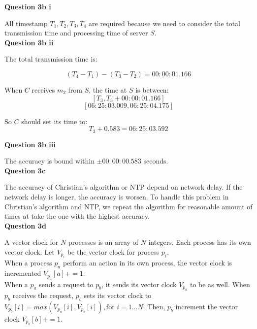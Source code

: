 \documentclass[11pt,a4paper]{report}
\begin{document}
\begin{multicols*}{2}
\noindent \textbf{Question 3b i}

\noindent All timestamp $T_1,T_2,T_3,T_4$ are required because we need to consider the total transmission time and processing time of server $S$.\\

\noindent \textbf{Question 3b ii}

\noindent The total transmission time is:

$$(T_4 - T_1) - (T_3 - T_2) = 00:00:01.166$$

\noindent When $C$ receives $m_2$ from $S$, the time at $S$ is between: 
$$[T_3, T_3 + 00:00:01.166]$$
$$[06:25:03.009, 06:25:04.175]$$

\noindent So $C$ should set its time to:
$$T_3 + 0.583 = 06:25:03.592$$

\noindent \textbf{Question 3b iii}

\noindent The accuracy is bound within $\pm 00:00:00.583$ seconds.\\

\noindent \textbf{Question 3c}

\noindent The accuracy of Christian's algorithm or NTP depend on network delay. If the network delay is longer, the accuracy is worsen. To handle this problem in Christian's algorithm and NTP, we repeat the algorithm for reasonable amount of times at take the one with the highest accuracy.\\

\noindent \textbf{Question 3d}

\noindent A vector clock for $N$ processes is an array of $N$ integers. Each process has its own vector clock. Let $V_{p_i}$ be the vector clock for process $p_i$.\\

\noindent When a process $p_a$ perform an action in its own process, the vector clock is incremented $V_{p_a}[a] += 1$.\\

\noindent When a $p_a$ sends a request to $p_b$, it sends its vector clock $V_{p_a}$ to be as well. When $p_b$ receives the request, $p_b$ sets its vector clock to $V_{p_b}[i] = max(V_{p_a}[i], V_{p_b}[i]), \text{for } i=1\ldots N$. Then, $p_b$ increment the vector clock $V_{p_b}[b] += 1$.

\end{multicols*}
\end{document}
